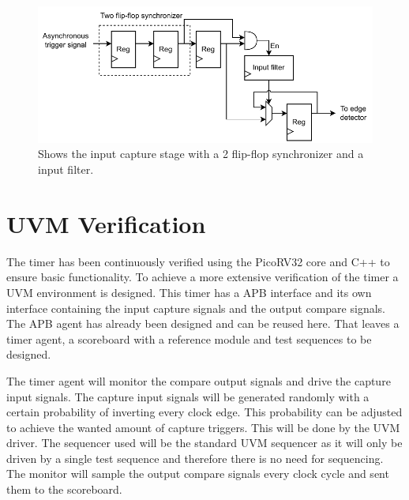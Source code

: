 \documentclass[./dissertation.tex]{subfiles}
\begin{document}
\begin{figure}[H]
    \centering
    \includegraphics[width = 1\linewidth]{subfiles/imgs/IP_Blocks_Pics/2ffsync.drawio.pdf}
    \caption{Shows the input capture stage with a 2 flip-flop synchronizer and a input filter.}
    \label{fig:2ff_sync_and_if}
\end{figure}

\section{UVM Verification}
The timer has been continuously verified using the PicoRV32 core and C++ to ensure basic functionality. To achieve a more extensive verification of the timer a UVM environment is designed. This timer has a APB interface and its own interface containing the input capture signals and the output compare signals. The APB agent has already been designed and can be reused here. That leaves a timer agent, a scoreboard with a reference module and test sequences to be designed. 

The timer agent will monitor the compare output signals and drive the capture input signals. The capture input signals will be generated randomly with a certain probability of inverting every clock edge. This probability can be adjusted to achieve the wanted amount of capture triggers. This will be done by the UVM driver. The sequencer used will be the standard UVM sequencer as it will only be driven by a single test sequence and therefore there is no need for sequencing. The monitor will sample the output compare signals every clock cycle and sent them to the scoreboard.
\end{document}
